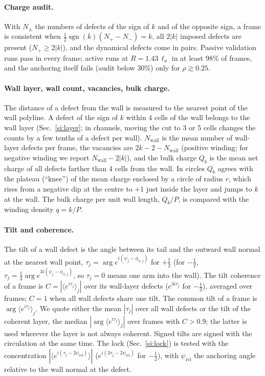 \documentclass[aps,prl,onecolumn,superscriptaddress,amsmath,amssymb,nofootinbib]{revtex4-2}
\newcommand{\half}{\tfrac12}
\newcommand{\la}{\ell_a}
\begin{document}
\paragraph{Charge audit.} With $N_\pm$ the numbers of defects of the sign of $k$ and of the opposite sign, a frame is consistent when
$\tfrac12\operatorname{sgn}(k)(N_+-N_-)=k$, all $2|k|$ imposed defects are present ($N_+\ge2|k|$), and the dynamical defects come in pairs. Passive validation
runs pass in every frame; active runs at $R=1.43\,\la$ in at least 98\% of frames, and the anchoring itself fails (audit below 30\%) only for $\rho\gtrsim0.25$.

\paragraph{Wall layer, wall count, vacancies, bulk charge.} The distance of a defect from the wall is measured to the nearest point of the wall polyline.
A defect of the sign of $k$ within 4 cells of the wall belongs to the wall layer (Sec.~\ref{si:layer}; in channels, moving the cut to 3 or 5 cells changes the counts by a few
tenths of a defect per wall). $N_\mathrm{wall}$ is the mean number of wall-layer defects per frame, the vacancies are $2k-2-N_\mathrm{wall}$ (positive winding; for negative
winding we report $N_\mathrm{wall}-2|k|$), and the bulk charge $Q_b$ is the mean net charge of all defects farther than 4 cells from the wall. In circles
$Q_b$ agrees with the plateau (``knee'') of the mean charge enclosed by a circle of radius $r$, which rises from a negative dip at the centre to $+1$ just inside
the layer and jumps to $k$ at the wall. The bulk charge per unit wall length, $Q_b/P$, is compared with the winding density $q=k/P$.

\paragraph{Tilt and coherence.} The tilt of a wall defect is the angle between its tail and the outward wall normal at the nearest wall point,
$\tau_j=\arg e^{i(\psi_j-\phi_{n,j})}$ for $+\half$ (for $-\half$, $\tau_j=\frac13\arg e^{3i(\psi_j-\phi_{n,j})}$, so $\tau_j=0$ means one arm into the wall).
The tilt coherence of a frame is $C=|\langle e^{i\tau_j}\rangle_j|$ over its wall-layer defects ($e^{3i\tau_j}$ for $-\half$), averaged over frames; $C=1$ when all
wall defects share one tilt. The common tilt of a frame is $\arg\langle e^{i\tau_j}\rangle_j$. We quote either the mean $|\tau_j|$ over all wall defects or the tilt of
the coherent layer, the median $|\arg\langle e^{i\tau_j}\rangle_j|$ over frames with $C>0.9$; the latter is used wherever the layer is not always coherent. Signed tilts
are signed with the circulation at the same time. The lock (Sec.~\ref{si:lock}) is tested with the concentration $|\langle e^{i(\tau_j-2\psi_\mathrm{rel})}\rangle|$
($e^{i(3\tau_j-2\psi_\mathrm{rel})}$ for $-\half$), with $\psi_\mathrm{rel}$ the anchoring angle relative to the wall normal at the defect.
\end{document}
